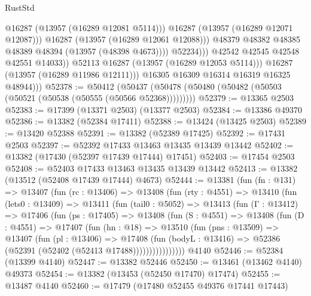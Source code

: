 \begin{lexlean}{RustStd}
\begin{coremodule}
                                  @16287
                                  (@13957 (@16289 @12081 @5114)))
                                @16287
                                (@13957 (@16289 @12071 @12087)))
                              @16287
                              (@13957 (@16289 @12061 @12088)))
                            @48379
                            @48382
                            @48385
                            @48389
                            @48394
                            (@13957 (@48398 @4673))))
                        @52234)))
                  @42542
                  @42545
                  @42548
                  @42551
                  @14033))
              @52113
              @16287
              (@13957 (@16289 @12053 @5114)))
            @16287
            (@13957 (@16289 @11986 @12111)))
          @16305
          @16309
          @16314
          @16319
          @16325
          @48944)))
@52378 := @50412
    (@50437 (@50478 (@50480 (@50482 (@50503 (@50521 (@50538 (@50555 (@50566 @52368)))))))))
@52379 := @13365 @2503
@52383 := @17399 (@13371 @2503) (@13377 @2503)
@52384 := @13386 @49370
@52386 := @13382 (@52384 @17411)
@52388 := @13424 (@13425 @2503)
@52389 := @13420 @52388
@52391 := @13382 (@52389 @17425)
@52392 := @17431 @2503
@52397 := @52392 @17433 @13463 @13435 @13439 @13442
@52402 := @13382 (@17430 (@52397 @17439 @17444) @17451)
@52403 := @17454 @2503
@52408 := @52403 @17433 @13463 @13435 @13439 @13442
@52413 := @13382 (@13512 (@52408 @17439 @17444) @4673)
@52444 := @13381
    (fun (fn : @131) =>
    @13407
      (fun (rc : @13406) =>
      @13408
        (fun (rty : @4551) =>
        @13410
          (fun (lets0 : @13409) =>
          @13411
            (fun (tail0 : @5052) =>
            @13413
              (fun (Γ : @13412) =>
              @17406
                (fun (ps : @17405) =>
                @13408
                  (fun (S : @4551) =>
                  @13408
                    (fun (D : @4551) =>
                    @17407
                      (fun (hn : @18) =>
                      @13510
                        (fun (pns : @13509) =>
                        @13407
                          (fun (pl : @13406) =>
                          @17408
                            (fun (bodyL : @13416) =>
                            @52386 (@52391 (@52402 (@52413 @17488))))))))))))))))
    @4140
@52446 := @52384 (@13399 @4140)
@52447 := @13382 @52446
@52450 := @13461 (@13462 @4140) @49373
@52454 := @13382 (@13453 (@52450 @17470) @17474)
@52455 := @13487 @4140
@52460 := @17479 (@17480 @52455 @49376 @17441 @17443)

\end{coremodule}
\end{lexlean}
